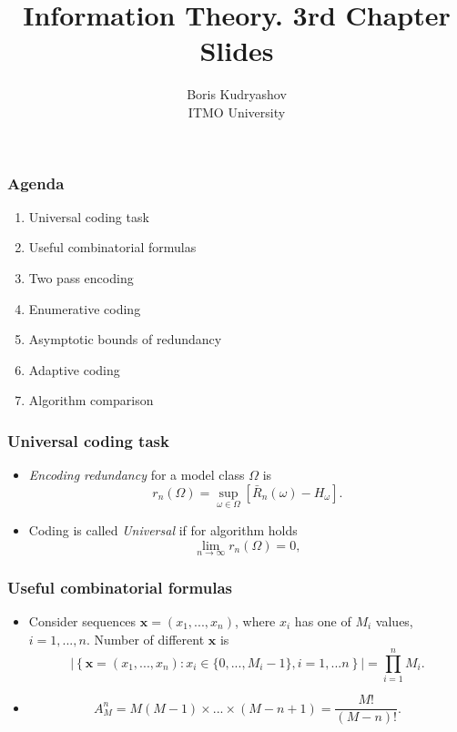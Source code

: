 \documentclass[14pt]{beamer}
\title{\small{Information Theory. 3rd Chapter Slides}}
\author{\huge{
Boris Kudryashov \\
\vspace{30pt}
ITMO University
}}
\renewcommand{\vec}[1]{\ensuremath{\boldsymbol{#1}}}
\begin{document}
\maketitle

\begin{frame}
\frametitle{Agenda}
\begin{enumerate}    
    
\item Universal coding task
\item Useful combinatorial formulas
\item Two pass encoding
\item Enumerative coding
\item Asymptotic bounds of redundancy
\item Adaptive coding
\item Algorithm comparison

\end{enumerate}
\end{frame}

\begin{frame}
\frametitle{Universal coding task}
\begin{itemize}    
    
    \item  \textit{Encoding redundancy} for a model class $\Omega$ is
    \begin{equation}
    \label{redundancy}
     r_n(\Omega ) = \mathop {\sup }\limits_{ \omega \in \Omega }
    \left[ {\bar {R}_n(\omega)- H_\omega } \right].
    \end{equation}
    
    \item Coding is called \textit{Universal} if for algorithm holds
    \[
    \lim_{n\rightarrow \infty}  r_n(\Omega ) =0,
    \]
    
\end{itemize}
\end{frame}



\begin{frame}
\frametitle{Useful combinatorial formulas}
\begin{itemize}    
    
    \item Consider sequences $\vec x = (x_1 ,...,x_n )$, where $x_i$ has one of $M_i$ values, $i = 1,...,n$. Number of different $\vec x$ is
    \begin{equation}
    \label{eq3_1} \left| {\left\{ {\vec x = (x_1 ,...,x_n ):x_i \in
    \{0,...,M_i - 1\},i = 1,...n} \right\}} \right| = \prod\limits_{i = 1}^n {M_i } .
    \end{equation}
    
    \item 
    \begin{equation}
    \label{eq3_2}
    A_M^n = M(M - 1)\times ...\times (M - n + 1)
    =\frac{M!}{(M - n)!} .
    \end{equation}
    
\end{itemize}
\end{frame}
\end{document}
